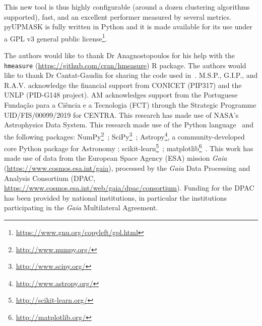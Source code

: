 \documentclass{aa}
\begin{document}
 This new tool is thus highly configurable (around a dozen clustering
 algorithms supported), fast, and an excellent performer measured by
 several metrics.
 pyUPMASK is fully written in Python and it is made available for its use
 under a GPL v3 general public
 license\footnote{\url{https://www.gnu.org/copyleft/gpl.html}}.






\begin{acknowledgements}
The authors would like to thank Dr Anagnostopoulos for his help with the
\texttt{hmeasure} (\url{https://github.com/cran/hmeasure}) R package.
%
The authors would like to thank Dr Cantat-Gaudin for sharing the code used
in~\cite{Cantat_2018}.
%
M.S.P., G.I.P., and R.A.V. acknowledge the financial support from CONICET 
(PIP317) and the UNLP (PID-G148 project).
%
AM acknowledges support from the Portuguese Fundação para a Ciência e a
Tecnologia (FCT) through the Strategic Programme UID/FIS/00099/2019 for CENTRA.
%
This research has made use of NASA's Astrophysics Data System.
%
This research made use of the Python language~\citep{vanRossum_1995}
and the following packages:
NumPy\footnote{\url{http://www.numpy.org/}}~\citep{vanDerWalt_2011};
SciPy\footnote{\url{http://www.scipy.org/}}~\citep{Jones_2001};
Astropy\footnote{\url{http://www.astropy.org/}}, a community-developed core Python
package for Astronomy \citep{astropy:2013,astropy:2018};
scikit-learn\footnote{\url{http://scikit-learn.org/}}~\citep{pedregosa_2011};
matplotlib\footnote{\url{http://matplotlib.org/}}~\citep{hunter_2007}.
%
This work has made use of data from the European Space Agency (ESA) mission
{\it Gaia} (\url{https://www.cosmos.esa.int/gaia}), processed by the {\it Gaia}
Data Processing and Analysis Consortium (DPAC,
\url{https://www.cosmos.esa.int/web/gaia/dpac/consortium}). Funding for the DPAC
has been provided by national institutions, in particular the institutions
participating in the {\it Gaia} Multilateral Agreement.
\end{acknowledgements}










\end{document}
